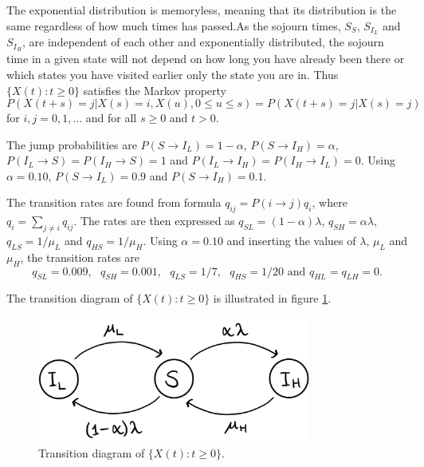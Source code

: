 
The exponential distribution is memoryless, meaning that its distribution is the same regardless of how much times has passed.As the sojourn times, $S_S$, $S_{I_L}$ and $S_{I_H}$, are independent of each other and exponentially distributed, the sojourn time in a given state will not depend on how long you have already been there or which states you have visited earlier only the state you are in. Thus $\{X(t):t \geq 0 \}$  satisfies the Markov property
$$P(X(t+s)=j|X(s)=i, X(u), 0 \leq u \leq s)=P(X(t+s)=j|X(s)=j)$$ 
for $i,j = 0,1,...$ and for all $s \geq 0$ and $t >0 $.

The jump probabilities are $P(S \rightarrow I_L)= 1 - \alpha$, $P(S \rightarrow I_H)= \alpha$, $P(I_L \rightarrow S)= P(I_H \rightarrow S) = 1$ and $P(I_L \rightarrow I_H)= P(I_H \rightarrow I_L) = 0$. Using $\alpha = 0.10$, $P(S \rightarrow I_L)= 0.9$ and $P(S \rightarrow I_H)= 0.1$. 

The transition rates are found from formula $q_{ij} = P(i \rightarrow j ) q_i$, where $q_i = \sum_{j \neq i} q_{ij}$. The rates are then expressed as $q_{SL} = (1-\alpha)\lambda $, $q_{SH} = \alpha \lambda$, $q_{LS} = 1/\mu_L$ and $q_{HS} = 1/\mu_H$. Using $\alpha = 0.10$ and inserting the values of $\lambda$, $\mu_L$ and $\mu_H$, the transition rates are 
$$q_{SL} = 0.009,\text{ } q_{SH} = 0.001, \text{ } q_{LS} = 1/7, \text{ } q_{HS} = 1/20 \text{ and } q_{HL}=q_{LH}=0.$$

The transition diagram of $\{X(t):t \geq 0 \}$ is illustrated in figure \ref{transdiagramA}. 

\begin{figure}
    \centering
    \includegraphics[width=90mm]{TransDiag1A.png}
    \caption{Transition diagram of $\{X(t):t\geq0\}$.}
    \label{transdiagramA}
\end{figure}




